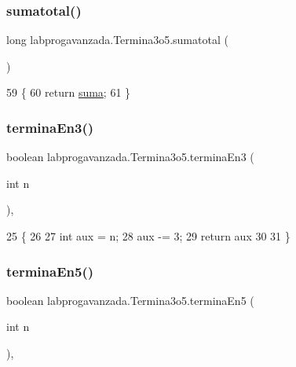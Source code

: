 \subsubsection{\texorpdfstring{sumatotal()}{sumatotal()}}
{\footnotesize\ttfamily long labprogavanzada.\+Termina3o5.\+sumatotal (\begin{DoxyParamCaption}{ }\end{DoxyParamCaption})\hspace{0.3cm}{\ttfamily [inline]}}


\begin{DoxyCode}
59                            \{
60         \textcolor{keywordflow}{return} \mbox{\hyperlink{classlabprogavanzada_1_1_termina3o5_a4603870c546f5834699d492d0d4450ae}{suma}};
61     \}
\end{DoxyCode}
\mbox{\label{classlabprogavanzada_1_1_termina3o5_a2c1157a071b19562e9740dbac68b443d}} 
\subsubsection{\texorpdfstring{termina\+En3()}{terminaEn3()}}
{\footnotesize\ttfamily boolean labprogavanzada.\+Termina3o5.\+termina\+En3 (\begin{DoxyParamCaption}\item[{int}]{n }\end{DoxyParamCaption})\hspace{0.3cm}{\ttfamily [inline]}, {\ttfamily [private]}}


\begin{DoxyCode}
25                                      \{
26         
27         \textcolor{keywordtype}{int} aux = n;
28         aux -= 3;
29         \textcolor{keywordflow}{return} aux%
30         
31     \}
\end{DoxyCode}
\mbox{\label{classlabprogavanzada_1_1_termina3o5_aea7ebcb9dea337e83e865d71e61a525c}} 
\subsubsection{\texorpdfstring{termina\+En5()}{terminaEn5()}}
{\footnotesize\ttfamily boolean labprogavanzada.\+Termina3o5.\+termina\+En5 (\begin{DoxyParamCaption}\item[{int}]{n }\end{DoxyParamCaption})\hspace{0.3cm}{\ttfamily [inline]}, {\ttfamily [private]}}


